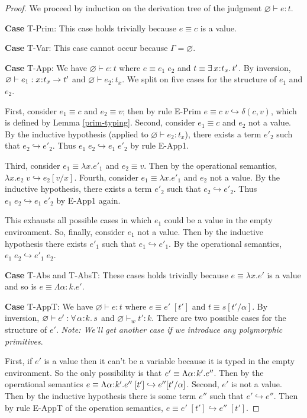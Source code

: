 \documentclass[11pt]{article}
\newcommand{\al}{\alpha}
\newcommand{\bind}{\hspace{0.05em}{:}\hspace{0.05em}} %
\newcommand{\step}{\hookrightarrow}
\newcommand{\existype}[3]{\exists\, #1\bind #2.\, #3}
\newcommand{\polytype}[3]{\forall\, #1\bind #2.\, #3}
\newcommand{\functype}[3]{#1\bind #2 \rightarrow #3}
\begin{document}
\begin{proof} We proceed by induction on the derivation tree of the judgment $\varnothing \vdash e : t$.

{\bf Case} {\sc T-Prim}: This case holds trivially because $e \equiv c$ is a value.

{\bf Case} {\sc T-Var}: This case cannot occur because $\Gamma = \varnothing$.

{\bf Case} {\sc T-App}: We have $\varnothing \vdash e : t$ where $e \equiv e_1\; e_2$ and $t \equiv \existype{x}{t_x}{t'}$. By inversion, $\varnothing \vdash e_1 : \functype{x}{t_x}{t'}$ and $\varnothing \vdash e_2 : t_x$. We split on five cases for the structure of $e_1$ and $e_2$.

First, consider $e_1 \equiv c$ and $e_2 \equiv v$; then by rule {\sc E-Prim} $e \equiv c\; v \hookrightarrow \delta(c,v)$, which is defined by Lemma \ref{prim-typing}.
Second, consider $e_1 \equiv c$ and $e_2$ not a value. By the inductive hypothesis (applied to $\varnothing \vdash e_2 : t_x$), there exists a term $e'_2$ such that $e_2 \step e'_2$. Thus $e_1\; e_2 \step e_1 \; e'_2$ by rule {\sc E-App1}.

Third, consider $e_1 \equiv \lambda x.e'_1$ and $e_2 \equiv v$. Then by the operational semantics, $\lambda x.e_2 \; v \step e_2[v/x]$. Fourth, consider $e_1 \equiv \lambda x.e'_1$ and $e_2$ not a value. By the inductive hypothesis, there exists a term $e'_2$ such that $e_2 \step e'_2$. Thus $e_1\; e_2 \step e_1 \; e'_2$ by {\sc E-App1} again.

This exhausts all possible cases in which $e_1$ could be a value in the empty environment. So, finally, consider $e_1$ not a value. Then by the inductive hypothesis there exists $e'_1$ such that $e_1 \hookrightarrow e'_1$. By the operational semantics, $e_1\; e_2 \hookrightarrow e'_1\; e_2$.

{\bf Case} {\sc T-Abs} and {\sc T-AbsT}: These cases holds trivially because $e \equiv \lambda x.e'$ is a value and so is $e \equiv \Lambda \al:k.e'$.

{\bf Case} {\sc T-AppT}: We have $\varnothing \vdash e : t$ where $e \equiv e'\; [t']$ and $t \equiv s[t'/\al]$. By inversion, $\varnothing \vdash e' : \polytype{\al}{k}{s}$ and $\varnothing \vdash_w t' : k$. There are two possible cases for the structure of $e'$. {\em Note: We'll get another case if we introduce any polymorphic primitives}. 

First, if $e'$ is a value then it can't be a variable because it is typed in the empty environment. So the only possibility is that $e' \equiv \Lambda \al\bind k'.e''$. Then by the operational semantics $e\equiv \Lambda \al\bind k'.e''\; [t'] \step e''[t'/\al]$. Second, $e'$ is not a value. Then by the inductive hypothesis there is some term $e''$ such that $e' \step e''$. Then by rule {\sc E-AppT} of the operation semantics, $e \equiv e'\; [t'] \step e''\; [t']$.


\end{proof}
\end{document}
